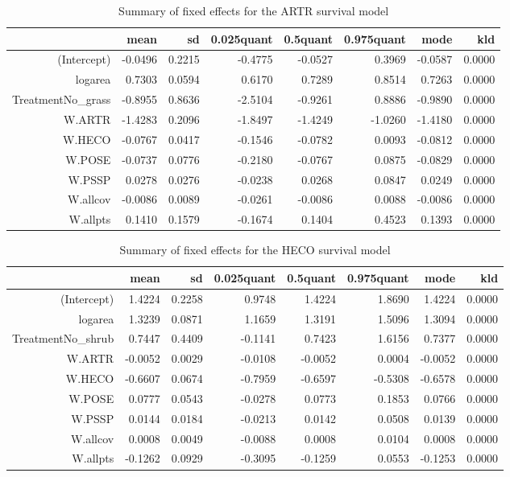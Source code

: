 \begin{table}[ht]
\centering
\caption{Summary of fixed effects for the ARTR survival model} 
\label{ARTRsurvival}
\begin{tabular}{rrrrrrrr}
  \hline
 & mean & sd & 0.025quant & 0.5quant & 0.975quant & mode & kld \\ 
  \hline
(Intercept) & -0.0496 & 0.2215 & -0.4775 & -0.0527 & 0.3969 & -0.0587 & 0.0000 \\ 
  logarea & 0.7303 & 0.0594 & 0.6170 & 0.7289 & 0.8514 & 0.7263 & 0.0000 \\ 
  TreatmentNo\_grass & -0.8955 & 0.8636 & -2.5104 & -0.9261 & 0.8886 & -0.9890 & 0.0000 \\ 
  W.ARTR & -1.4283 & 0.2096 & -1.8497 & -1.4249 & -1.0260 & -1.4180 & 0.0000 \\ 
  W.HECO & -0.0767 & 0.0417 & -0.1546 & -0.0782 & 0.0093 & -0.0812 & 0.0000 \\ 
  W.POSE & -0.0737 & 0.0776 & -0.2180 & -0.0767 & 0.0875 & -0.0829 & 0.0000 \\ 
  W.PSSP & 0.0278 & 0.0276 & -0.0238 & 0.0268 & 0.0847 & 0.0249 & 0.0000 \\ 
  W.allcov & -0.0086 & 0.0089 & -0.0261 & -0.0086 & 0.0088 & -0.0086 & 0.0000 \\ 
  W.allpts & 0.1410 & 0.1579 & -0.1674 & 0.1404 & 0.4523 & 0.1393 & 0.0000 \\ 
   \hline
\end{tabular}
\end{table}

\begin{table}[ht]
\centering
\caption{Summary of fixed effects for the HECO survival model} 
\label{HECOsurvival}
\begin{tabular}{rrrrrrrr}
  \hline
 & mean & sd & 0.025quant & 0.5quant & 0.975quant & mode & kld \\ 
  \hline
(Intercept) & 1.4224 & 0.2258 & 0.9748 & 1.4224 & 1.8690 & 1.4224 & 0.0000 \\ 
  logarea & 1.3239 & 0.0871 & 1.1659 & 1.3191 & 1.5096 & 1.3094 & 0.0000 \\ 
  TreatmentNo\_shrub & 0.7447 & 0.4409 & -0.1141 & 0.7423 & 1.6156 & 0.7377 & 0.0000 \\ 
  W.ARTR & -0.0052 & 0.0029 & -0.0108 & -0.0052 & 0.0004 & -0.0052 & 0.0000 \\ 
  W.HECO & -0.6607 & 0.0674 & -0.7959 & -0.6597 & -0.5308 & -0.6578 & 0.0000 \\ 
  W.POSE & 0.0777 & 0.0543 & -0.0278 & 0.0773 & 0.1853 & 0.0766 & 0.0000 \\ 
  W.PSSP & 0.0144 & 0.0184 & -0.0213 & 0.0142 & 0.0508 & 0.0139 & 0.0000 \\ 
  W.allcov & 0.0008 & 0.0049 & -0.0088 & 0.0008 & 0.0104 & 0.0008 & 0.0000 \\ 
  W.allpts & -0.1262 & 0.0929 & -0.3095 & -0.1259 & 0.0553 & -0.1253 & 0.0000 \\ 
   \hline
\end{tabular}
\end{table}

